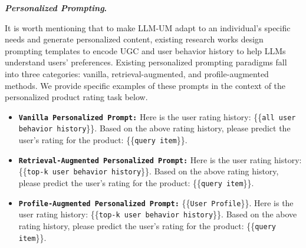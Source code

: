 \documentclass[11pt]{article}
\renewcommand\paragraph[1]{\vspace{0.05in} \noindent \textbf{#1.}}
\begin{document}
\begin{mybox}
\label{personalizeprompting}


\paragraph{\textit{Personalized Prompting}}

It is worth mentioning that to make LLM-UM adapt to an individual's specific needs and generate personalized content, existing research works design prompting templates to encode UGC and user behavior history to help LLMs understand users' preferences. Existing personalized prompting paradigms fall into three categories: vanilla, retrieval-augmented, and profile-augmented methods. We provide specific examples of these prompts in the context of the personalized product rating task below.

\begin{itemize}
\item \texttt{\textbf{Vanilla Personalized Prompt:}} Here is the user rating history: \{\{\texttt{all user behavior history}\}\}. Based on the above rating history, please predict the user's rating for the product: \{\{\texttt{query item}\}\}.
\item \texttt{\textbf{Retrieval-Augmented Personalized Prompt:}} Here is the user rating history: \{\{\texttt{top-k user behavior history}\}\}. Based on the above rating history, please predict the user's rating for the product: \{\{\texttt{query item}\}\}.
\item \texttt{\textbf{Profile-Augmented Personalized Prompt:}} \{\{\texttt{User Profile}\}\}. Here is the user rating history: \{\{\texttt{top-k user behavior history}\}\}. Based on the above rating history, please predict the user's rating for the product: \{\{\texttt{query item}\}\}.
\end{itemize}



\end{mybox}
\end{document}
